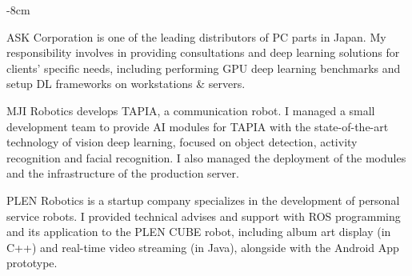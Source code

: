 \documentclass[10pt,a4paper]{altacv}
\begin{document}

\begin{adjustwidth}{}{-8cm}
\makecvheader
\end{adjustwidth}


ASK Corporation is one of the leading distributors of PC parts in Japan. My responsibility involves in providing consultations and deep learning solutions for clients' specific needs, including performing GPU deep learning benchmarks and setup DL frameworks on workstations \& servers.

\divider

MJI Robotics develops TAPIA, a communication robot. I managed a small development team to provide AI modules for TAPIA with the state-of-the-art technology of vision deep learning, focused on object detection, activity recognition and facial recognition. I also managed the deployment of the modules and the infrastructure of the production server.

\divider

PLEN Robotics is a startup company specializes in the development of personal service robots.
I provided technical advises and support with ROS programming and its application to the PLEN CUBE robot, including album art display (in C++) and real-time video streaming (in Java), alongside with the Android App prototype.
\end{document}

